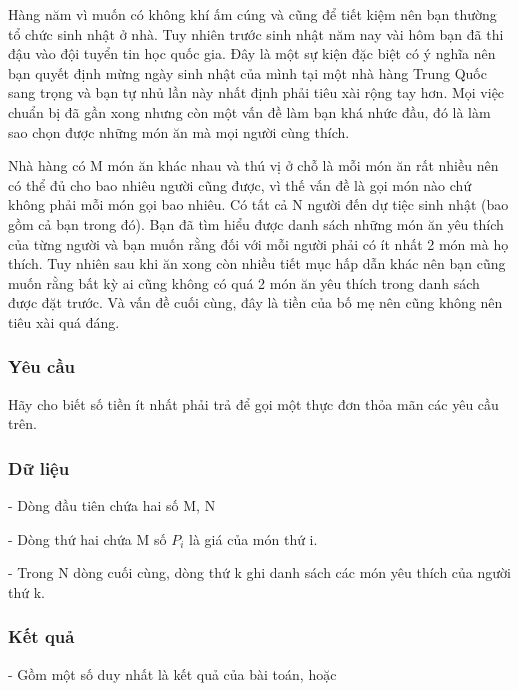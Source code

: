 







   Hàng năm vì muốn có không khí ấm cúng và cũng để tiết kiệm nên bạn thường tổ chức sinh nhật ở nhà. Tuy nhiên trước sinh nhật năm nay vài hôm bạn đã thi đậu vào đội tuyển tin học quốc gia. Đây là một sự kiện đặc biệt có ý nghĩa nên bạn quyết định mừng ngày sinh nhật của mình tại một nhà hàng Trung Quốc sang trọng và bạn tự nhủ lần này nhất định phải tiêu xài rộng tay hơn. Mọi việc chuẩn bị đã gần xong nhưng còn một vấn đề làm bạn khá nhức đầu, đó là làm sao chọn được những món ăn mà mọi người cùng thích.  

   Nhà hàng có M món ăn khác nhau và thú vị ở chỗ là mỗi món ăn rất nhiều nên có thể đủ cho bao nhiêu người cũng được, vì thế vấn đề là gọi món nào chứ không phải mỗi món gọi bao nhiêu. Có tất cả N người đến dự tiệc sinh nhật (bao gồm cả bạn trong đó). Bạn đã tìm hiểu được danh sách những món ăn yêu thích của từng người và bạn muốn rằng đối với mỗi người phải có ít nhất 2 món mà họ thích. Tuy nhiên sau khi ăn xong còn nhiều tiết mục hấp dẫn khác nên bạn cũng muốn rằng bất kỳ ai cũng không có quá 2 món ăn yêu thích trong danh sách được đặt trước. Và vấn đề cuối cùng, đây là tiền của bố mẹ nên cũng không nên tiêu xài quá đáng.  

\subsubsection{   Yêu cầu  }

   Hãy cho biết số tiền ít nhất phải trả để gọi một thực đơn thỏa mãn các yêu cầu trên.  

\subsubsection{   Dữ liệu  }

   - Dòng đầu tiên chứa hai số M, N   


   - Dòng thứ hai chứa M số $P_{i}$   là giá của món thứ i.   


   - Trong N dòng cuối cùng, dòng thứ k ghi danh sách các món yêu thích của người thứ k.  

\subsubsection{   Kết quả  }

   - Gồm một số duy nhất là kết quả của bài toán, hoặc   


